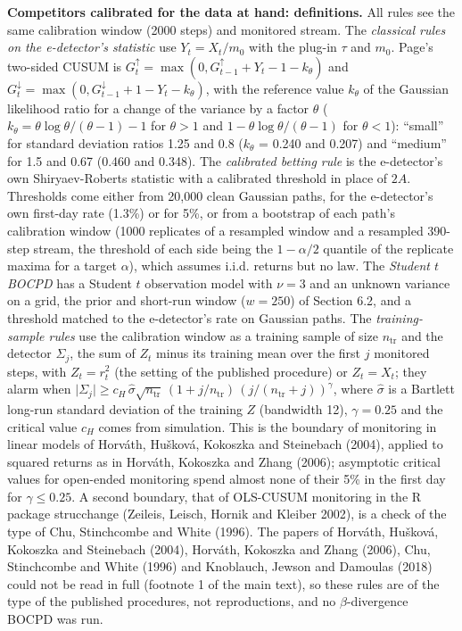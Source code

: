 \documentclass[
]{article}
\begin{document}
\textbf{Competitors calibrated for the data at hand: definitions.} All
rules see the same calibration window (2000 steps) and monitored stream.
The \emph{classical rules on the e-detector's statistic} use
\(Y_t = X_t/m_0\) with the plug-in \(\tau\) and \(m_0\). Page's
two-sided CUSUM is
\(G_t^{\uparrow} = \max(0, G_{t-1}^{\uparrow} + Y_t - 1 - k_\theta)\)
and
\(G_t^{\downarrow} = \max(0, G_{t-1}^{\downarrow} + 1 - Y_t - k_\theta)\),
with the reference value \(k_\theta\) of the Gaussian likelihood ratio
for a change of the variance by a factor \(\theta\)
(\(k_\theta = \theta\log\theta/(\theta - 1) - 1\) for \(\theta > 1\) and
\(1 - \theta\log\theta/(\theta - 1)\) for \(\theta < 1\)): ``small'' for
standard deviation ratios 1.25 and 0.8 (\(k_\theta\) = 0.240 and 0.207)
and ``medium'' for 1.5 and 0.67 (0.460 and 0.348). The \emph{calibrated
betting rule} is the e-detector's own Shiryaev-Roberts statistic with a
calibrated threshold in place of \(2A\). Thresholds come either from
20,000 clean Gaussian paths, for the e-detector's own first-day rate
(1.3\%) or for 5\%, or from a bootstrap of each path's calibration
window (1000 replicates of a resampled window and a resampled 390-step
stream, the threshold of each side being the \(1 - \alpha/2\) quantile
of the replicate maxima for a target \(\alpha\)), which assumes i.i.d.
returns but no law. The \emph{Student \(t\) BOCPD} has a Student \(t\)
observation model with \(\nu = 3\) and an unknown variance on a grid,
the prior and short-run window (\(w = 250\)) of Section 6.2, and a
threshold matched to the e-detector's rate on Gaussian paths. The
\emph{training-sample rules} use the calibration window as a training
sample of size \(n_{\mathrm{tr}}\) and the detector \(\Sigma_j\), the
sum of \(Z_t\) minus its training mean over the first \(j\) monitored
steps, with \(Z_t = r_t^2\) (the setting of the published procedure) or
\(Z_t = X_t\); they alarm when
\(\lvert\Sigma_j\rvert \ge c_H\,\hat\sigma\sqrt{n_{\mathrm{tr}}}\,(1 + j/n_{\mathrm{tr}})\,(j/(n_{\mathrm{tr}} + j))^{\gamma}\),
where \(\hat\sigma\) is a Bartlett long-run standard deviation of the
training \(Z\) (bandwidth 12), \(\gamma = 0.25\) and the critical value
\(c_H\) comes from simulation. This is the boundary of monitoring in
linear models of Horváth, Hušková, Kokoszka and Steinebach (2004),
applied to squared returns as in Horváth, Kokoszka and Zhang (2006);
asymptotic critical values for open-ended monitoring spend almost none
of their 5\% in the first day for \(\gamma \le 0.25\). A second
boundary, that of OLS-CUSUM monitoring in the R package strucchange
(Zeileis, Leisch, Hornik and Kleiber 2002), is a check of the type of
Chu, Stinchcombe and White (1996). The papers of Horváth, Hušková,
Kokoszka and Steinebach (2004), Horváth, Kokoszka and Zhang (2006), Chu,
Stinchcombe and White (1996) and Knoblauch, Jewson and Damoulas (2018)
could not be read in full (footnote 1 of the main text), so these rules
are of the type of the published procedures, not reproductions, and no
\(\beta\)-divergence BOCPD was run.
\end{document}
